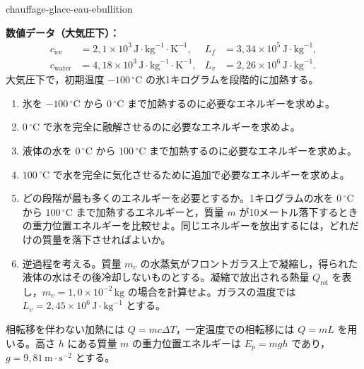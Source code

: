 
\begin{exo}{chauffage-glace-eau-ebullition}

\textbf{数値データ（大気圧下）：}
\[
\begin{aligned}
c_{\text{ice}} &= 2{,}1\times10^3\,\text{J}\!\cdot\!\text{kg}^{-1}\!\cdot\!\text{K}^{-1},
& L_f &= 3{,}34\times10^5\,\text{J}\!\cdot\!\text{kg}^{-1},\\
c_{\text{water}} &= 4{,}18\times10^3\,\text{J}\!\cdot\!\text{kg}^{-1}\!\cdot\!\text{K}^{-1},
& L_v &= 2{,}26\times10^6\,\text{J}\!\cdot\!\text{kg}^{-1}.
\end{aligned}
\]
大気圧下で，初期温度 $-100\,{}^\circ\text{C}$ の氷1キログラムを段階的に加熱する。

\begin{enumerate}
  \item 氷を $-100\,{}^\circ\text{C}$ から $0\,{}^\circ\text{C}$ まで加熱するのに必要なエネルギーを求めよ。
  \item $0\,{}^\circ\text{C}$ で氷を完全に融解させるのに必要なエネルギーを求めよ。
  \item 液体の水を $0\,{}^\circ\text{C}$ から $100\,{}^\circ\text{C}$ まで加熱するのに必要なエネルギーを求めよ。
  \item $100\,{}^\circ\text{C}$ で水を完全に気化させるために追加で必要なエネルギーを求めよ。
  \item どの段階が最も多くのエネルギーを必要とするか。1キログラムの水を $0\,{}^\circ\text{C}$ から $100\,{}^\circ\text{C}$ まで加熱するエネルギーと，質量 $m$ が10メートル落下するときの重力位置エネルギーを比較せよ。同じエネルギーを放出するには，どれだけの質量を落下させればよいか。
  \item 逆過程を考える。質量 $m_v$ の水蒸気がフロントガラス上で凝縮し，得られた液体の水はその後冷却しないものとする。凝縮で放出される熱量 $Q_{\text{rel}}$ を表し，$m_v=1{,}0\times10^{-2}\,\text{kg}$ の場合を計算せよ。ガラスの温度では $L_v=2{,}45\times10^6\,\text{J}\!\cdot\!\text{kg}^{-1}$ とする。
\end{enumerate}

\begin{indication}
相転移を伴わない加熱には $Q=mc\Delta T$，一定温度での相転移には $Q=mL$ を用いる。高さ $h$ にある質量 $m$ の重力位置エネルギーは $E_p=mgh$ であり，$g=9{,}81\,\text{m}\!\cdot\!\text{s}^{-2}$ とする。
\end{indication}


\end{exo}

